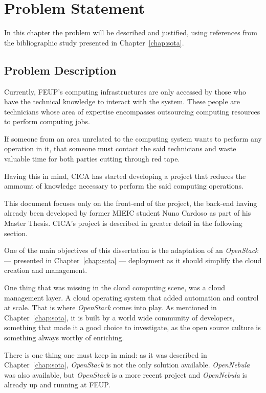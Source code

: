 \chapter{Problem Statement} \label{chap:chap3}

In this chapter the problem will be described and justified, using references from the bibliographic study presented in Chapter~\ref{chap:sota}.

\section{Problem Description}


Currently, FEUP's computing infrastructures are only accessed by those who have the technical knowledge to interact with the system. These people are technicians whose area of expertise encompasses outsourcing computing resources to perform computing jobs. 

If someone from an area unrelated to the computing system wants to perform any operation in it, that someone must contact the said technicians and waste valuable time for both parties cutting through red tape.

Having this in mind, CICA has started developing a project that reduces the ammount of knowledge necessary to perform the said computing operations.

This document focuses only on the front-end of the project, the back-end having already been developed by former MIEIC student Nuno Cardoso as part of his Master Thesis. CICA's project is described in greater detail in the following section.

One of the main objectives of this dissertation is the adaptation of an \textit{OpenStack} --- presented in Chapter~\ref{chap:sota} --- deployment as it should simplify the cloud creation and management.

One thing that was missing in the cloud computing scene, was a cloud management layer. A cloud operating system that added automation and control at scale. That is where \textit{OpenStack} comes into play. As mentioned in Chapter~\ref{chap:sota}, it is built by a world wide community of developers, something that made it a good choice to investigate, as the open source culture is something always worthy of enriching.~\cite{https://github.com/dellcloudedge/crowbar/wiki/OpenStack-Essex-Deploy-Day}

There is one thing one must keep in mind: as it was described in Chapter~\ref{chap:sota}, \textit{OpenStack} is not the only solution available. \textit{OpenNebula} was also available, but \textit{OpenStack} is a more recent project and \textit{OpenNebula} is already up and running at FEUP. 

